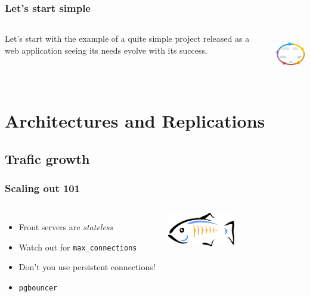 \documentclass[english]{beamer}
\begin{document}
\begin{frame}[fragile]
  \frametitle{Let's start simple}

  \linebreak

\begin{columns}[c]

  Let's start with the example of a quite simple project released as a web
  application seeing its needs evolve with its success.


\includegraphics[height=5em]{development_life_cycle.png}
\end{columns}
\end{frame}

\section{Architectures and Replications}
\subsection{Trafic growth}
\frame{\tableofcontents[currentsubsection]}

\begin{frame}[fragile]
  \frametitle{Scaling out 101}

  \linebreak
  \linebreak

\begin{columns}[c]

  \begin{itemize}
   \item<1-> Front servers are \textit{stateless}
   \item<2-> Watch out for \texttt{max\_connections}
   \item<2-> Don't you use persistent connections!
   \item<3-> \texttt{pgbouncer}
  \end{itemize}  

\includegraphics[height=4em]{bouncer.png}
\end{columns}
\end{frame}
\end{document}
